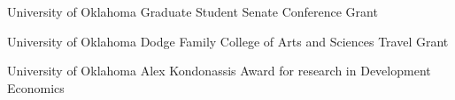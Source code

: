 {%
	University of Oklahoma}
{%
	Graduate Student Senate Conference Grant}
{}

{%
	University of Oklahoma}
{%
	Dodge Family College of Arts and Sciences Travel Grant}
{}

{%
	University of Oklahoma}
{%
	Alex Kondonassis Award for research in Development \\ Economics }
{}
